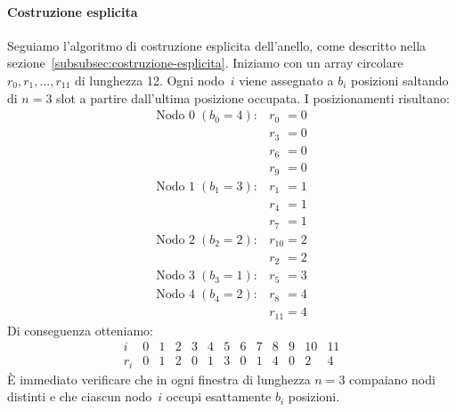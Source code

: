 \paragraph{Costruzione esplicita}
Seguiamo l'algoritmo di costruzione esplicita dell'anello, come descritto nella sezione~\ref{subsubsec:costruzione-esplicita}. Iniziamo con un array circolare \(r_0, r_1, \dots, r_{11}\) di lunghezza 12. Ogni nodo~\(i\) viene assegnato a \(b_i\) posizioni saltando di \(n=3\) slot a partire dall'ultima posizione occupata.
I posizionamenti risultano:
\[
    \begin{array}{rl}
        \text{Nodo }0\;(b_0=4): & r_{0\phantom{0}} = 0 \\
                                & r_{3\phantom{0}} = 0 \\
                                & r_{6\phantom{0}} = 0 \\
                                & r_{9\phantom{0}} = 0 \\[0.5ex]
        \text{Nodo }1\;(b_1=3): & r_{1\phantom{0}} = 1 \\
                                & r_{4\phantom{0}} = 1 \\
                                & r_{7\phantom{0}} = 1 \\[0.5ex]
        \text{Nodo }2\;(b_2=2): & r_{10} = 2 \\
                                & r_{2\phantom{0}} = 2 \\[0.5ex]
        \text{Nodo }3\;(b_3=1): & r_{5\phantom{0}} = 3 \\[0.5ex]
        \text{Nodo }4\;(b_4=2): & r_{8\phantom{0}} = 4 \\
                                & r_{11} = 4
    \end{array}
\]
Di conseguenza otteniamo:
\[
    \begin{array}{c|cccccccccccc}
        i   & 0 & 1 & 2 & 3 & 4 & 5 & 6 & 7 & 8 & 9 & 10 & 11\\\hline
        r_i & 0 & 1 & 2 & 0 & 1 & 3 & 0 & 1 & 4 & 0 & 2  & 4
    \end{array}
\]
È immediato verificare che in ogni finestra di lunghezza \(n=3\) compaiano nodi distinti e che ciascun nodo~\(i\) occupi esattamente \(b_i\) posizioni.

